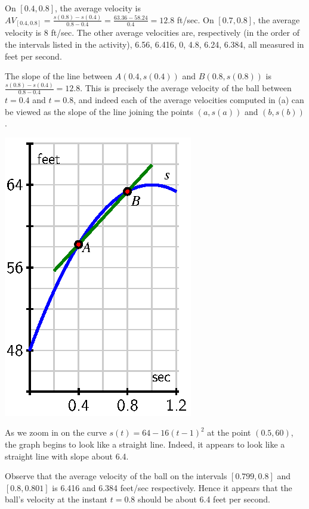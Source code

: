 \begin{activitySolution}
\ba
	\item On $[0.4,0.8]$, the average velocity is $AV_{[0.4,0.8]} = \frac{s(0.8)-s(0.4)}{0.8-0.4} = \frac{63.36-58.24}{0.4} = 12.8$ ft/sec.  On $[0.7,0.8]$, the average velocity is 8 ft/sec.  The other average velocities are, respectively (in the order of the intervals listed in the activity), 6.56, 6.416, 0, 4.8, 6.24, 6.384, all measured in feet per second.
	\item The slope of the line between $A(0.4, s(0.4))$ and $B(0.8, s(0.8))$ is $\frac{s(0.8)-s(0.4)}{0.8-0.4} = 12.8$.  This is precisely the average velocity of the ball between $t = 0.4$ and $t = 0.8$, and indeed each of the average velocities computed in (a) can be viewed as the slope of the line joining the points $(a,s(a))$ and $(b,s(b))$.
	\begin{center}
\includegraphics{figures/1_1_Act1Soln.eps}
\end{center}
	\item As we zoom in on the curve $s(t) = 64 - 16(t-1)^2$ at the point $(0.5, 60)$, the graph begins to look like a straight line.  Indeed, it appears to look like a straight line with slope about 6.4.
	\item Observe that the average velocity of the ball on the intervals $[0.799,0.8]$ and $[0.8,0.801]$ is 6.416 and 6.384 feet/sec respectively.  Hence it appears that the ball's velocity at the instant $t = 0.8$ should be about 6.4 feet per second.
\ea
\end{activitySolution}
\aftera